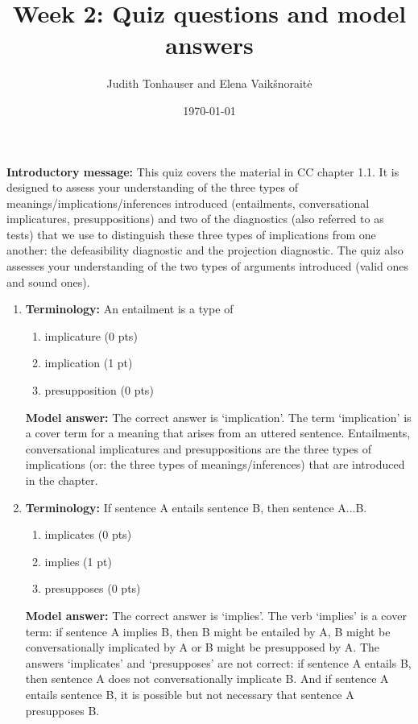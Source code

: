 \documentclass[a4,11pt]{article}
\title{Week 2: Quiz questions and model answers}
\author{Judith Tonhauser and Elena Vaik\v snorait\.{e} }
\date{\today}
\begin{document}
\maketitle

{\bf Introductory message:} This quiz covers the material in CC chapter 1.1. It is designed to assess your understanding of the three types of meanings/implications/inferences introduced (entailments, conversational implicatures, presuppositions) and two of the diagnostics (also referred to as tests) that we use to distinguish these three types of implications from one another: the defeasibility diagnostic and the projection diagnostic. The quiz also assesses your understanding of the two types of arguments introduced (valid ones and sound ones).

\begin{enumerate}[leftmargin = 12pt]

   \item {\bf Terminology:} An entailment is a type of 
   \begin{enumerate}[noitemsep]
       \item implicature (0 pts)
        \item implication (1 pt)
           \item presupposition (0 pts)
   \end{enumerate}
   
   {\bf Model answer:} The correct answer is `implication'. The term `implication' is a cover term for a meaning that arises from an uttered sentence.  Entailments, conversational implicatures and presuppositions are the three types of implications (or: the three types of meanings/inferences) that are introduced in the chapter.
 
    \item {\bf Terminology:} If sentence A entails sentence B, then sentence A...B.
   \begin{enumerate}[noitemsep]
       \item implicates (0 pts)
        \item implies (1 pt)
           \item presupposes (0 pts)
   \end{enumerate}
   
   {\bf Model answer:} The correct answer is `implies'. The verb `implies' is a cover term: if sentence A implies B, then B might be entailed by A, B might be conversationally implicated by A or B might be presupposed by A. The answers `implicates' and `presupposes' are not correct: if sentence A entails B, then sentence A does not conversationally implicate B. And if sentence A entails sentence B, it is possible but not necessary that sentence A presupposes B.
   

\end{enumerate}
\end{document}

